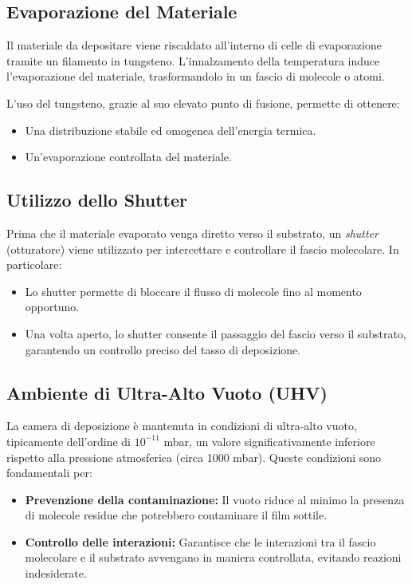 \subsection{Evaporazione del Materiale}

Il materiale da depositare viene riscaldato all'interno di celle di evaporazione tramite un filamento in tungsteno. L'innalzamento della temperatura induce l'evaporazione del materiale, trasformandolo in un fascio di molecole o atomi.

L'uso del tungsteno, grazie al suo elevato punto di fusione, permette di ottenere:
\begin{itemize}
    \item Una distribuzione stabile ed omogenea dell'energia termica.
    \item Un'evaporazione controllata del materiale.
\end{itemize}

\subsection{Utilizzo dello Shutter}

Prima che il materiale evaporato venga diretto verso il substrato, un \textit{shutter} (otturatore) viene utilizzato per intercettare e controllare il fascio molecolare. In particolare:
\begin{itemize}
    \item Lo shutter permette di bloccare il flusso di molecole fino al momento opportuno.
    \item Una volta aperto, lo shutter consente il passaggio del fascio verso il substrato, garantendo un controllo preciso del tasso di deposizione.
\end{itemize}

\subsection{Ambiente di Ultra-Alto Vuoto (UHV)}

La camera di deposizione è mantenuta in condizioni di ultra-alto vuoto, tipicamente dell'ordine di \(10^{-11}\) mbar, un valore significativamente inferiore rispetto alla pressione atmosferica (circa 1000 mbar). Queste condizioni sono fondamentali per:

\begin{itemize}
    \item \textbf{Prevenzione della contaminazione:} Il vuoto riduce al minimo la presenza di molecole residue che potrebbero contaminare il film sottile.
    \item \textbf{Controllo delle interazioni:} Garantisce che le interazioni tra il fascio molecolare e il substrato avvengano in maniera controllata, evitando reazioni indesiderate.
\end{itemize}

